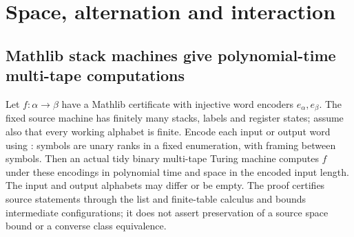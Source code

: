 \section{Space, alternation and interaction}

\begin{result}
\subsection{Mathlib stack machines give polynomial-time multi-tape computations}
Let $f:\alpha\to\beta$ have a Mathlib  certificate with
injective word encoders $e_\alpha,e_\beta$. The fixed source machine has finitely many stacks,
labels and register states; assume also that every working alphabet is finite. Encode each
input or output word using : symbols are unary ranks in a fixed
enumeration, with framing between symbols. Then an actual tidy binary multi-tape Turing machine
computes $f$ under these encodings in polynomial time and space in the encoded input length.
The input and output alphabets may differ or be empty. The proof certifies source statements
through the list and finite-table calculus and bounds intermediate configurations; it does not
assert preservation of a source space bound or a converse class equivalence.
\end{result}

